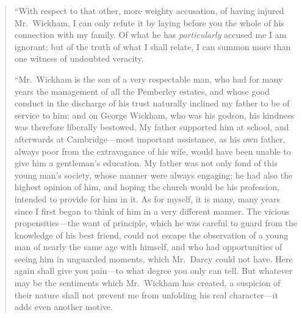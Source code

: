 \documentclass[12pt,english]{book}
\begin{document}
\begin{quotation}
{}``With respect to that other, more weighty accusation, of having
injured Mr.\ Wickham, I can only refute it by laying before you the
whole of his connection with my family. Of what he has \textit{particularly}
accused me I am ignorant; but of the truth of what I shall relate,
I can summon more than one witness of undoubted veracity.

{}``Mr.\ Wickham is the son of a very respectable man, who had for
many years the management of all the Pemberley estates, and whose
good conduct in the discharge of his trust naturally inclined my father
to be of service to him; and on George Wickham, who was his godson,
his kindness was therefore liberally bestowed. My father supported
him at school, and afterwards at Cambridge\mbox{---}most important
assistance, as his own father, always poor from the extravagance of
his wife, would have been unable to give him a gentleman's education.
My father was not only fond of this young man's society, whose manner
were always engaging; he had also the highest opinion of him, and
hoping the church would be his profession, intended to provide for
him in it. As for myself, it is many, many years since I first began
to think of him in a very different manner. The vicious propensities\mbox{---}the
want of principle, which he was careful to guard from the knowledge
of his best friend, could not escape the observation of a young man
of nearly the same age with himself, and who had opportunities of
seeing him in unguarded moments, which Mr.\ Darcy could not have.
Here again shall give you pain\mbox{---}to what degree you only can
tell. But whatever may be the sentiments which Mr.\ Wickham has created,
a suspicion of their nature shall not prevent me from unfolding his
real character\mbox{---}it adds even another motive.


\end{quotation}
\end{document}
